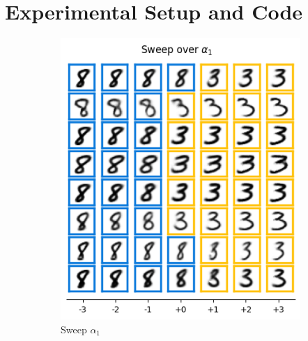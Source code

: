 \section{Experimental Setup and Code}
\label{sec:experiments}
\begin{figure}[t]
	\centering
	\begin{subfigure}[t]{.23\linewidth}
		\includegraphics[width=.9\textwidth]{../openreview/pictures/Figure3/alpha_1.png}
		\caption{Sweep $\alpha_1$}
	\end{subfigure}
	\begin{subfigure}[t]{.23\linewidth}

\end{subfigure}
\end{figure}
